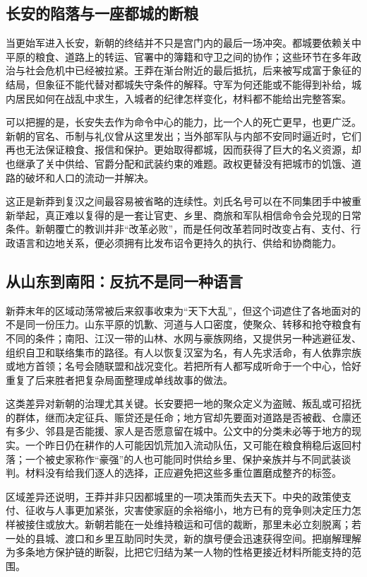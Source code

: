 \subsection{长安的陷落与一座都城的断粮}

当更始军进入长安，新朝的终结并不只是宫门内的最后一场冲突。都城要依赖关中平原的粮食、道路上的转运、官署中的簿籍和守卫之间的协作；这些环节在多年政治与社会危机中已经被拉紧。王莽在渐台附近的最后抵抗，后来被写成富于象征的结局，但象征不能代替对都城失守条件的解释。守军为何还能或不能得到补给，城内居民如何在战乱中求生，入城者的纪律怎样变化，材料都不能给出完整答案。

可以把握的是，长安失去作为命令中心的能力，比一个人的死亡更早，也更广泛。新朝的官名、币制与礼仪曾从这里发出；当外部军队与内部不安同时逼近时，它们再也无法保证粮食、报信和保护。更始取得都城，因而获得了巨大的名义资源，却也继承了关中供给、官爵分配和武装约束的难题。政权更替没有把城市的饥饿、道路的破坏和人口的流动一并解决。

这正是新莽到复汉之间最容易被省略的连续性。刘氏名号可以在不同集团手中被重新举起，真正难以复得的是一套让官吏、乡里、商旅和军队相信命令会兑现的日常条件。新朝覆亡的教训并非“改革必败”，而是任何改革若同时改变占有、支付、行政语言和边地关系，便必须拥有比发布诏令更持久的执行、供给和协商能力。

\subsection{从山东到南阳：反抗不是同一种语言}

新莽末年的区域动荡常被后来叙事收束为“天下大乱”，但这个词遮住了各地面对的不是同一份压力。山东平原的饥歉、河道与人口密度，使聚众、转移和抢夺粮食有不同的条件；南阳、江汉一带的山林、水网与豪族网络，又提供另一种逃避征发、组织自卫和联络集市的路径。有人以恢复汉室为名，有人先求活命，有人依靠宗族或地方首领；名号会随联盟和战况变化。若把所有人都写成听命于一个中心，恰好重复了后来胜者把复杂局面整理成单线故事的做法。

这类差异对新朝的治理尤其关键。长安要把一地的聚众定义为盗贼、叛乱或可招抚的群体，继而决定征兵、赈贷还是任命；地方官却先要面对道路是否被截、仓廪还有多少、邻县是否能援、家人是否愿意留在城中。公文中的分类未必等于地方的现实。一个昨日仍在耕作的人可能因饥荒加入流动队伍，又可能在粮食稍稳后返回村落；一个被史家称作“豪强”的人也可能同时供给乡里、保护亲族并与不同武装谈判。材料没有给我们逐人的选择，正应避免把这些多重位置磨成整齐的标签。

区域差异还说明，王莽并非只因都城里的一项决策而失去天下。中央的政策使支付、征收与人事更加紧张，灾害使家庭的余裕缩小，地方已有的竞争则决定压力怎样被接住或放大。新朝若能在一处维持粮运和可信的裁断，那里未必立刻脱离；若一处的县城、渡口和乡里互助同时失灵，新的旗号便会迅速获得空间。把崩解理解为多条地方保护链的断裂，比把它归结为某一人物的性格更接近材料所能支持的范围。

